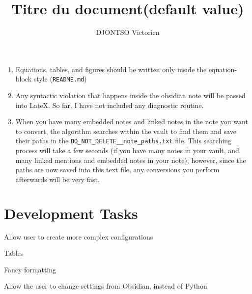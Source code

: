 \documentclass{doc_class_fontsize}{extarticle}
\begin{document}
\allowdisplaybreaks{}

\date{}
\author{DJONTSO Victorien}
\title{Titre du document(default value)}



\tableofcontents{}
\newpage{}


\begin{enumerate}
\item Equations, tables, and figures should be written only inside the equation-block style (\texttt{README.md})
\item Any syntactic violation that happens inside the obsidian note will be passed into LateX. So far, I have not included any diagnostic routine.
\item When you have many embedded notes and linked notes in the note you want to convert, the algorithm searches within the vault to find them and save their paths in the \texttt{DO_NOT_DELETE__note_paths.txt} file. This searching process will take a few seconds (if you have many notes in your vault, and many linked mentions and embedded notes in your note), however, since the paths are now saved into this text file, any conversions you perform afterwards will be very fast.
\end{enumerate}





\section{Development Tasks}


\begin{todolist}
\item Allow user to create more complex configurations
\item Tables
\begin{todolist}
\item Fancy formatting
\end{todolist}
\item Allow the user to change settings from Obsidian, instead of Python
\end{todolist}

\end{document}
